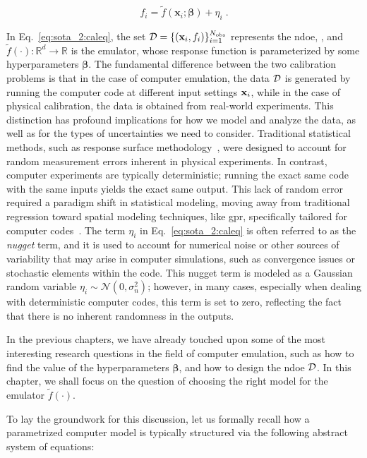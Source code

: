 \begin{equation}
\label{eq:sota_2:caleq}
f_i = \tilde{f}(\mathbf{x}_i; \boldsymbol{\beta}) + \eta_i \;.
\end{equation}

In Eq.~\eqref{eq:sota_2:caleq}, the set $\mathcal{D} = \{(\mathbf{x}_i, f_i)\}_{i=1}^{N_{\mathrm{obs}}}$ represents the \gls{ndoe}, , and $\tilde{f}(\cdot) : \mathbb{R}^d \to \mathbb{R}$ is the emulator, whose response function is parameterized by some hyperparameters $\boldsymbol{\beta}$. The fundamental difference between the two calibration problems is that in the case of computer emulation, the data $\mathcal{D}$ is generated by running the computer code at different input settings $\mathbf{x}_i$, while in the case of physical calibration, the data is obtained from real-world experiments. This distinction has profound implications for how we model and analyze the data, as well as for the types of uncertainties we need to consider. Traditional statistical methods, such as response surface methodology~\cite{box1951}, were designed to account for random measurement errors inherent in physical experiments. In contrast, computer experiments are typically deterministic; running the exact same code with the same inputs yields the exact same output. This lack of random error required a paradigm shift in statistical modeling, moving away from traditional regression toward spatial modeling techniques, like \gls{gpr}, specifically tailored for computer codes~\cite{sacks1989}. The term $\eta_i$ in Eq.~\eqref{eq:sota_2:caleq} is often referred to as the \textit{nugget} term, and it is used to account for numerical noise or other sources of variability that may arise in computer simulations, such as convergence issues or stochastic elements within the code. This nugget term is modeled as a Gaussian random variable $\eta_i \sim \mathcal{N}(0, \sigma_n^2)$; however, in many cases, especially when dealing with deterministic computer codes, this term is set to zero, reflecting the fact that there is no inherent randomness in the outputs. 

\smallskip
In the previous chapters, we have already touched upon some of the most interesting research questions in the field of computer emulation, such as how to find the value of the hyperparameters $\boldsymbol{\beta}$, and how to design the \gls{ndoe} $\mathcal{D}$. In this chapter, we shall focus on the question of choosing the right model for the emulator $\tilde{f}(\cdot)$. 

\smallskip
To lay the groundwork for this discussion, let us formally recall how a parametrized computer model is typically structured via the following abstract system of equations:

